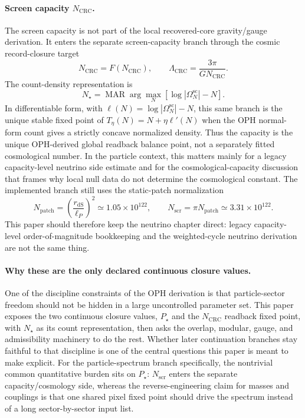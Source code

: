 \documentclass[11pt]{article}
\begin{document}
\paragraph{Screen capacity \(N_{\mathrm{CRC}}\).}
The screen capacity is not part of the local recovered-core gravity/gauge derivation. It enters
the separate screen-capacity branch through the cosmic record-closure target
\[
N_{\mathrm{CRC}}=F(N_{\mathrm{CRC}}),
\qquad
\Lambda_{\mathrm{CRC}}=\frac{3\pi}{G N_{\mathrm{CRC}}}.
\]
The count-density representation is
\[
N_\star=\operatorname{MAR}\arg\max_N\left[\log|\Omega^{\mathrm{sc}}_N|-N\right].
\]
In differentiable form, with \(\ell(N)=\log|\Omega^{\mathrm{sc}}_N|-N\), this same branch is the
unique stable fixed point of \(T_\eta(N)=N+\eta\ell'(N)\) when the OPH normal-form count gives a
strictly concave normalized density. Thus the capacity is the unique OPH-derived global readback
balance point, not a separately fitted cosmological number.
In the particle context, this matters mainly for a legacy capacity-level neutrino side estimate and for the
cosmological-capacity discussion that frames why local null data do not determine the
cosmological constant. The implemented branch still uses the static-patch normalization
\[
N_{\mathrm{patch}}=\left(\frac{r_{\mathrm{dS}}}{\ell_P}\right)^2\simeq1.05\times10^{122},
\qquad
N_{\mathrm{scr}}=\pi N_{\mathrm{patch}}\simeq3.31\times10^{122}.
\]
This paper should therefore keep the neutrino chapter direct:
legacy capacity-level order-of-magnitude bookkeeping and the weighted-cycle neutrino derivation are not the
same thing.

\paragraph{Why these are the only declared continuous closure values.}
One of the discipline constraints of the OPH derivation is that particle-sector freedom should not
be hidden in a large uncontrolled parameter set. This paper exposes the two continuous closure
values, \(P_\star\) and the \(N_{\mathrm{CRC}}\) readback fixed point, with \(N_\star\) as its
count representation, then asks
the overlap, modular, gauge, and admissibility machinery to do the rest. Whether
later continuation branches stay faithful to that discipline is one of the central questions this
paper is meant to make explicit. For the particle-spectrum branch specifically, the nontrivial
common quantitative burden sits on \(P_\star\): \(N_{\mathrm{scr}}\) enters the separate
capacity/cosmology side, whereas the reverse-engineering claim for masses and couplings is that
one shared pixel fixed point should drive the spectrum instead of a long sector-by-sector input
list.
\end{document}

